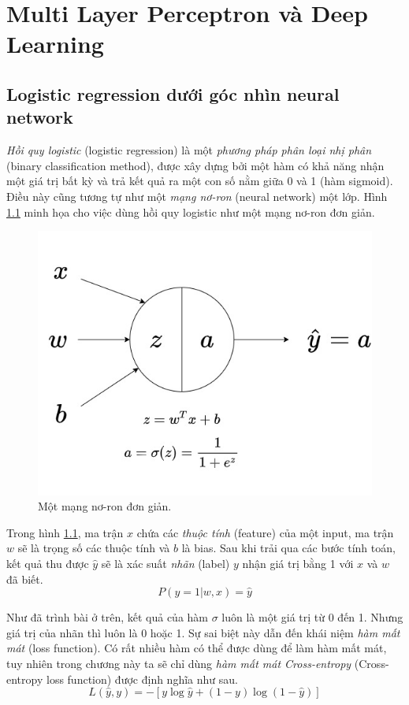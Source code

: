 \chapter{Multi Layer Perceptron và Deep Learning}
\label{chp:03}

\section{Logistic regression dưới góc nhìn neural network}
\label{sec31}
\textit{Hồi quy logistic} (logistic regression) là một \textit{phương pháp phân loại nhị phân} (binary classification method), được xây dựng bởi một hàm có khả năng nhận một giá trị bất kỳ và trả kết quả ra một con số nằm giữa 0 và 1 (hàm sigmoid). Điều này cũng tương tự như một \textit{mạng nơ-ron} (neural network) một lớp. Hình \ref{fig:LogisticRegressionNN} minh họa cho việc dùng hồi quy logistic như một mạng nơ-ron đơn giản.

\begin{figure}[!h]
	\centering
		\includegraphics[width=0.5\columnwidth]{chapter03/figure/LogisticRegressionNN.jpg}
        \caption{Một mạng nơ-ron đơn giản.}
        \label{fig:LogisticRegressionNN}
		\centering
\end{figure}

Trong hình \ref{fig:LogisticRegressionNN}, ma trận $x$ chứa các \textit{thuộc tính} (feature) của một input, ma trận $w$ sẽ là trọng số các thuộc tính và $b$ là bias. Sau khi trải qua các bước tính toán, kết quả thu được $\hat{y}$ sẽ là xác suất \textit{nhãn} (label) $y$ nhận giá trị bằng 1 với $x$ và $w$ đã biết.
\[ P(y=1|w,x) = \hat{y}\]

Như đã trình bài ở trên, kết quả của hàm $\sigma$ luôn là một giá trị từ 0 đến 1. Nhưng giá trị của nhãn thì luôn là 0 hoặc 1. Sự sai biệt này dẫn đến khái niệm \textit{hàm mất mát} (loss function). Có rất nhiều hàm có thể được dùng để làm hàm mất mát, tuy nhiên trong chương này ta sẽ chỉ dùng \textit{ hàm mất mát Cross-entropy} (Cross-entropy loss function) được định nghĩa như sau.
\[ L(\hat{y},y) = -  [y\log{\hat{y}} + (1-y)\log{(1-\hat{y})}] \]

